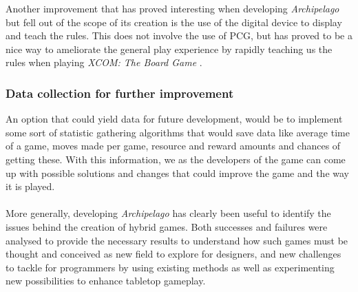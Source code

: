 Another improvement that has proved interesting when developing \textit{Archipelago} but fell out of the scope of its creation is the use of the digital device to display and teach the rules. This does not involve the use of PCG, but has proved to be a nice way to ameliorate the general play experience by rapidly teaching us the rules when playing \textit{XCOM: The Board Game} \cite{game:xcomtbg}. 

\subsubsection{Data collection for further improvement}
An option that could yield data for future development, would be to implement some sort of statistic gathering algorithms that would save data like average time of a game, moves made per game, resource and reward amounts and chances of getting these. With this information, we as the developers of the game can come up with possible solutions and changes that could improve the game and the way it is played.
\\\\
More generally, developing \textit{Archipelago} has clearly been useful to identify the issues behind the creation of hybrid games. Both successes and failures were analysed to provide the necessary results to understand how such games must be thought and conceived as new field to explore for designers, and new challenges to tackle for programmers by using existing methods as well as experimenting new possibilities to enhance tabletop gameplay. 
